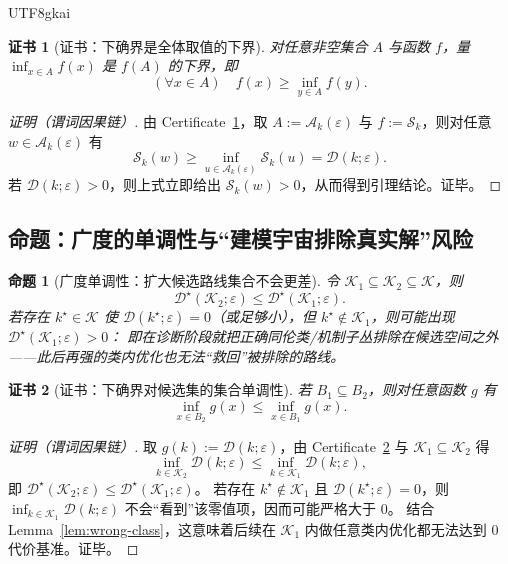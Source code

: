 \documentclass[12pt]{article}
\newtheorem{proposition}{命题}[section]
\newtheorem{certificate}{证书}[section]
\begin{document}
\begin{CJK*}{UTF8}{gkai}
\begin{certificate}[证书：下确界是全体取值的下界]
\label{cert:inf-lower-bound}
对任意非空集合 $A$ 与函数 $f$，量 $\inf_{x\in A}f(x)$ 是 $f(A)$ 的下界，即
\[
(\forall x\in A)\quad f(x)\ge \inf_{y\in A}f(y).
\]
\end{certificate}

\begin{proof}[证明（谓词因果链）]
由 Certificate~\ref{cert:inf-lower-bound}，取 $A:=\mathcal{A}_k(\varepsilon)$ 与 $f:=\mathcal{S}_k$，则对任意 $w\in\mathcal{A}
  _k(\varepsilon)$ 有
\[
\mathcal{S}_k(w)\ge \inf_{u\in\mathcal{A}_k(\varepsilon)}\mathcal{S}_k(u)=\mathcal{D}(k;\varepsilon).
\]
若 $\mathcal{D}(k;\varepsilon)>0$，则上式立即给出 $\mathcal{S}_k(w)>0$，从而得到引理结论。证毕。
\end{proof}

\subsection{命题：广度的单调性与“建模宇宙排除真实解”风险}

\begin{proposition}[广度单调性：扩大候选路线集合不会更差]
\label{prop:breadth-monotonicity}
令 $\mathcal{K}_1\subseteq \mathcal{K}_2 \subseteq \mathcal{K}$，则
\[
\mathcal{D}^\star(\mathcal{K}_2;\varepsilon) \le \mathcal{D}^\star(\mathcal{K}_1;\varepsilon).
\]
若存在 $k^\star\in\mathcal{K}$ 使 $\mathcal{D}(k^\star;\varepsilon)=0$（或足够小），但 $k^\star\notin\mathcal{K}_1$，则可能出现
  $\mathcal{D}^\star(\mathcal{K}_1;\varepsilon)>0$：
即在诊断阶段就把正确同伦类/机制子丛排除在候选空间之外——此后再强的类内优化也无法“救回”被排除的路线。
\end{proposition}

\begin{certificate}[证书：下确界对候选集的集合单调性]
\label{cert:inf-set-monotone}
若 $B_1\subseteq B_2$，则对任意函数 $g$ 有
\[
\inf_{x\in B_2}g(x)\le \inf_{x\in B_1}g(x).
\]
\end{certificate}

\begin{proof}[证明（谓词因果链）]
取 $g(k):=\mathcal{D}(k;\varepsilon)$，由 Certificate~\ref{cert:inf-set-monotone} 与 $\mathcal{K}_1\subseteq\mathcal{K}_2$ 得
\[
\inf_{k\in\mathcal{K}_2}\mathcal{D}(k;\varepsilon)\le \inf_{k\in\mathcal{K}_1}\mathcal{D}(k;\varepsilon),
\]
即 $\mathcal{D}^\star(\mathcal{K}_2;\varepsilon)\le \mathcal{D}^\star(\mathcal{K}_1;\varepsilon)$。
若存在 $k^\star\notin\mathcal{K}_1$ 且 $\mathcal{D}(k^\star;\varepsilon)=0$，则 $\inf_{k\in\mathcal{K}_1}\mathcal{D}(k;
  \varepsilon)$ 不会“看到”该零值项，因而可能严格大于 0。
结合 Lemma~\ref{lem:wrong-class}，这意味着后续在 $\mathcal{K}_1$ 内做任意类内优化都无法达到 0 代价基准。证毕。
\end{proof}


\end{CJK*}
\end{document}
